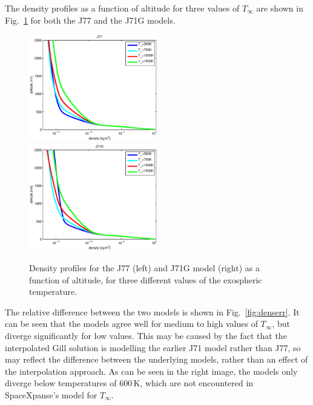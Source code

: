 \documentclass[a4paper]{article}
\begin{document}
The density profiles as a function of altitude for three values of $T_\infty$ are shown in Fig.~\ref{fig:dens} for both the J77 and the J71G models.
\begin{figure}
\includegraphics[width=0.5\textwidth]{dens_j77.eps}
\includegraphics[width=0.5\textwidth]{dens_j71g.eps}
\caption{Density profiles for the J77 (left) and J71G model (right) as a function of altitude, for three different values of the exospheric temperature.}
\label{fig:dens}
\end{figure}
The relative difference between the two models is shown in Fig.~\ref{fig:denserr}. It can be seen that the models agree well for medium to high values of $T_\infty$, but diverge significantly for low values. This may be caused by the fact that the interpolated Gill solution is modelling the earlier J71 model rather than J77, so may reflect the difference between the underlying models, rather than an effect of the interpolation approach. As can be seen in the right image, the models only diverge below temperatures of 600\,K, which are not encountered in SpaceXpanse's model for $T_\infty$.
\end{document}
